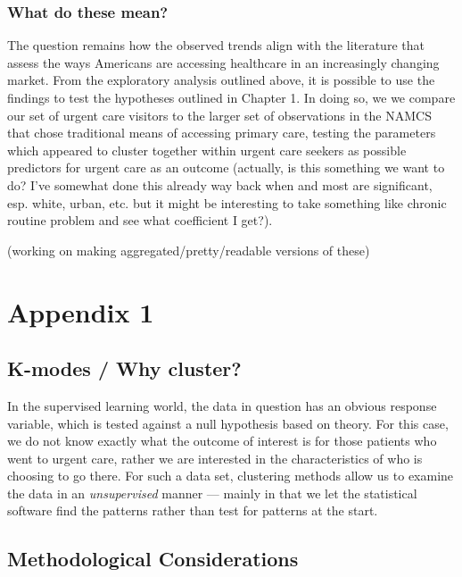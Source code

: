 \documentclass[12pt,twoside]{reedthesis}
\begin{document}
  \subsection{What do these mean?}\label{what-do-these-mean}
  
  The question remains how the observed trends align with the literature
  that assess the ways Americans are accessing healthcare in an
  increasingly changing market. From the exploratory analysis outlined
  above, it is possible to use the findings to test the hypotheses
  outlined in Chapter 1. In doing so, we we compare our set of urgent care
  visitors to the larger set of observations in the NAMCS that chose
  traditional means of accessing primary care, testing the parameters
  which appeared to cluster together within urgent care seekers as
  possible predictors for urgent care as an outcome (actually, is this
  something we want to do? I've somewhat done this already way back when
  and most are significant, esp. white, urban, etc. but it might be
  interesting to take something like chronic routine problem and see what
  coefficient I get?).
  
  (working on making aggregated/pretty/readable versions of these)
  
  \chapter*{Appendix 1}\label{appendix-1}
  
  \section*{K-modes / Why cluster?}\label{k-modes-why-cluster}
  
  In the supervised learning world, the data in question has an obvious
  response variable, which is tested against a null hypothesis based on
  theory. For this case, we do not know exactly what the outcome of
  interest is for those patients who went to urgent care, rather we are
  interested in the characteristics of who is choosing to go there. For
  such a data set, clustering methods allow us to examine the data in an
  \emph{unsupervised} manner --- mainly in that we let the statistical
  software find the patterns rather than test for patterns at the start.
  
  \section*{Methodological
  Considerations}\label{methodological-considerations}
  
\end{document}
